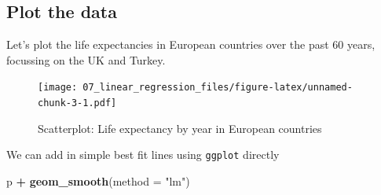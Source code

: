 \documentclass[12pt,]{krantz}
\makeatletter
\newenvironment{Shaded}{\begin{snugshade}}{\end{snugshade}}
\newcommand{\CommentTok}[1]{\textcolor[rgb]{0.56,0.35,0.01}{\textit{#1}}}
\newcommand{\DataTypeTok}[1]{\textcolor[rgb]{0.13,0.29,0.53}{#1}}
\newcommand{\DecValTok}[1]{\textcolor[rgb]{0.00,0.00,0.81}{#1}}
\newcommand{\KeywordTok}[1]{\textcolor[rgb]{0.13,0.29,0.53}{\textbf{#1}}}
\newcommand{\NormalTok}[1]{#1}
\newcommand{\OperatorTok}[1]{\textcolor[rgb]{0.81,0.36,0.00}{\textbf{#1}}}
\newcommand{\StringTok}[1]{\textcolor[rgb]{0.31,0.60,0.02}{#1}}
\newenvironment{kframe}{%
\medskip{}
\setlength{\fboxsep}{.8em}
 \def\at@end@of@kframe{}%
 \ifinner\ifhmode%
  \def\at@end@of@kframe{\end{minipage}}%
  \begin{minipage}{\columnwidth}%
 \fi\fi%
 \def\FrameCommand##1{\hskip\@totalleftmargin \hskip-\fboxsep
 \colorbox{shadecolor}{##1}\hskip-\fboxsep
     \hskip-\linewidth \hskip-\@totalleftmargin \hskip\columnwidth}%
 \MakeFramed {\advance\hsize-\width
   \@totalleftmargin\z@ \linewidth\hsize
   \@setminipage}}%
 {\par\unskip\endMakeFramed%
 \at@end@of@kframe}
\renewenvironment{Shaded}{\begin{kframe}}{\end{kframe}}
\theoremstyle{definition}
\theoremstyle{definition}
\theoremstyle{definition}
\theoremstyle{remark}
\makeatother
\begin{document}
\hypertarget{plot-the-data-2}{%
\subsection{Plot the data}\label{plot-the-data-2}}

Let's plot the life expectancies in European countries over the past 60
years, focussing on the UK and Turkey.

\begin{Shaded}
\end{Shaded}

\begin{figure}
\centering
\texttt{[image: 07\_linear\_regression\_files/figure-latex/unnamed-chunk-3-1.pdf]}
\caption{\label{fig:unnamed-chunk-3}Scatterplot: Life expectancy by year in
European countries}
\end{figure}

We can add in simple best fit lines using \texttt{ggplot} directly

\begin{Shaded}
\begin{Highlighting}[]
\NormalTok{p }\OperatorTok{+}
\StringTok{  }\KeywordTok{geom_smooth}\NormalTok{(}\DataTypeTok{method =} \StringTok{"lm"}\NormalTok{)}
\end{Highlighting}
\end{Shaded}
\end{document}
